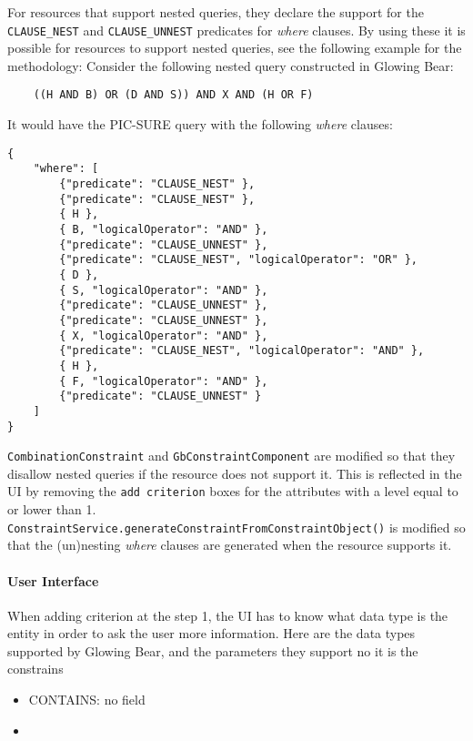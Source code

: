For resources that support nested queries, they declare the support for the \verb|CLAUSE_NEST| and \verb|CLAUSE_UNNEST| predicates for \emph{where} clauses.
By using these it is possible for resources to support nested queries, see the following example for the methodology:
Consider the following nested query constructed in Glowing Bear:
\begin{verbatim}
    ((H AND B) OR (D AND S)) AND X AND (H OR F)
\end{verbatim}
It would have the PIC-SURE query with the following \emph{where} clauses:
\begin{verbatim}
{
    "where": [
        {"predicate": "CLAUSE_NEST" },
        {"predicate": "CLAUSE_NEST" },
        { H },
        { B, "logicalOperator": "AND" },
        {"predicate": "CLAUSE_UNNEST" },
        {"predicate": "CLAUSE_NEST", "logicalOperator": "OR" },
        { D },
        { S, "logicalOperator": "AND" },
        {"predicate": "CLAUSE_UNNEST" },
        {"predicate": "CLAUSE_UNNEST" },
        { X, "logicalOperator": "AND" },
        {"predicate": "CLAUSE_NEST", "logicalOperator": "AND" },
        { H },
        { F, "logicalOperator": "AND" },
        {"predicate": "CLAUSE_UNNEST" }
    ]
}
\end{verbatim}

\verb|CombinationConstraint| and \verb|GbConstraintComponent| are modified so that they disallow nested queries if the resource does not support it.
This is reflected in the UI by removing the \verb|add criterion| boxes for the attributes with a level equal to or lower than 1.
\verb|ConstraintService.generateConstraintFromConstraintObject()| is modified so that the (un)nesting \emph{where} clauses are generated when the resource supports it.




\paragraph{User Interface}
When adding criterion at the step 1, the UI has to know what data type is the entity in order to ask the user more information.
Here are the data types supported by Glowing Bear, and the parameters they support no it is the constrains
\begin{itemize}
    \item CONTAINS: no field
    \item 
\end{itemize}

